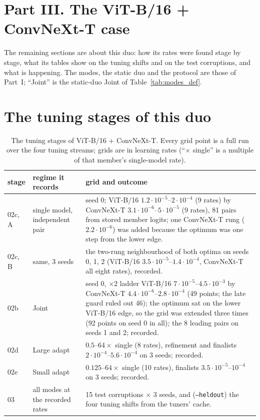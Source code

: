 \documentclass[10pt]{article}
\newcommand{\rl}[1]{\texttt{#1}}
\newcommand{\vit}{ViT-B/16}
\newcommand{\cnx}{ConvNeXt-T}
\begin{document}
\section*{Part III. The \vit{} + \cnx{} case}

The remaining sections are about this duo: how its rates were found stage by stage, what its tables show on the tuning shifts and on the test corruptions, and what is happening. The modes, the static duo and the protocol are those of Part~I; ``Joint'' is the static-duo Joint of Table~\ref{tab:modes_def}.

\section{The tuning stages of this duo}\label{sec:tuning}
\begin{table}[H]
  \centering\small
  \caption{The tuning stages of \vit{} + \cnx{}. Every grid point is a full run over the four tuning streams; grids are in learning rates (``$\times$ single'' is a multiple of that member's single-model rate).}
  \label{tab:stages}
  \begin{tabular}{@{}l p{4.2cm} p{7.3cm}@{}}
    \toprule
    stage & regime it records & grid and outcome \\
    \midrule
    02c, A & single model, independent pair & seed 0; \vit{} \(1.2{\cdot}10^{-5}\)--\(2{\cdot}10^{-4}\) (9 rates) by \cnx{} \(3.1{\cdot}10^{-6}\)--\(5{\cdot}10^{-5}\) (9 rates), 81 pairs from stored member logits; one \cnx{} rung (\(2.2{\cdot}10^{-6}\)) was added because the optimum was one step from the lower edge. \\
    02c, B & same, 3 seeds & the two-rung neighbourhood of both optima on seeds 0, 1, 2 (\vit{} \(3.5{\cdot}10^{-5}\)--\(1.4{\cdot}10^{-4}\), \cnx{} all eight rates), recorded. \\
    02b & Joint & seed 0, \(\times2\) ladder \vit{} \(7{\cdot}10^{-5}\)--\(4.5{\cdot}10^{-3}\) by \cnx{} \(4.4{\cdot}10^{-6}\)--\(2.8{\cdot}10^{-4}\) (49 points; the late guard ruled out 46); the optimum sat on the lower \vit{} edge, so the grid was extended three times (92 points on seed 0 in all); the 8 leading pairs on seeds 1 and 2; recorded. \\
    02d & Large adapt & \(0.5\)--\(64\times\) single (8 rates), refinement and finalists \(2{\cdot}10^{-4}\)--\(5.6{\cdot}10^{-4}\) on 3 seeds; recorded. \\
    02e & Small adapt & \(0.125\)--\(64\times\) single (10 rates), finalists \(3.5{\cdot}10^{-5}\)--\(10^{-4}\) on 3 seeds; recorded. \\
    03 & all modes at the recorded rates & 15 test corruptions $\times$ 3 seeds, and (\rl{--heldout}) the four tuning shifts from the tuners' cache. \\
    \bottomrule
  \end{tabular}
\end{table}
\end{document}
